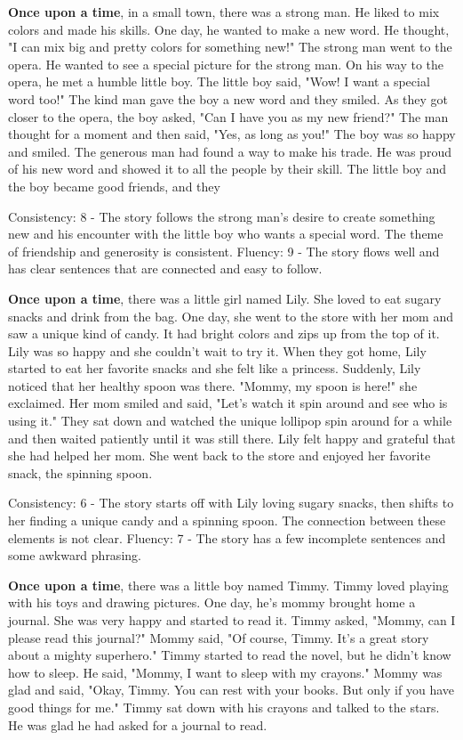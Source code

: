 \documentclass{article}
\begin{document}
\textbf{Once upon a time}, in a small town, there was a strong man. He liked to mix colors and made his skills. One day, he wanted to make a new word. He thought, "I can mix big and pretty colors for something new!" The strong man went to the opera. He wanted to see a special picture for the strong man. On his way to the opera, he met a humble little boy. The little boy said, "Wow! I want a special word too!" The kind man gave the boy a new word and they smiled. As they got closer to the opera, the boy asked, "Can I have you as my new friend?" The man thought for a moment and then said, "Yes, as long as you!" The boy was so happy and smiled. The generous man had found a way to make his trade. He was proud of his new word and showed it to all the people by their skill. The little boy and the boy became good friends, and they

Consistency: 8 - The story follows the strong man's desire to create something new and his encounter with the little boy who wants a special word. The theme of friendship and generosity is consistent.
Fluency: 9 - The story flows well and has clear sentences that are connected and easy to follow.

\textbf{Once upon a time}, there was a little girl named Lily. She loved to eat sugary snacks and drink from the bag. One day, she went to the store with her mom and saw a unique kind of candy. It had bright colors and zips up from the top of it. Lily was so happy and she couldn't wait to try it. When they got home, Lily started to eat her favorite snacks and she felt like a princess. Suddenly, Lily noticed that her healthy spoon was there. "Mommy, my spoon is here!" she exclaimed. Her mom smiled and said, "Let's watch it spin around and see who is using it." They sat down and watched the unique lollipop spin around for a while and then waited patiently until it was still there. Lily felt happy and grateful that she had helped her mom. She went back to the store and enjoyed her favorite snack, the spinning spoon.

Consistency: 6 - The story starts off with Lily loving sugary snacks, then shifts to her finding a unique candy and a spinning spoon. The connection between these elements is not clear.
Fluency: 7 - The story has a few incomplete sentences and some awkward phrasing.

\textbf{Once upon a time}, there was a little boy named Timmy. Timmy loved playing with his toys and drawing pictures. One day, he's mommy brought home a journal. She was very happy and started to read it. Timmy asked, "Mommy, can I please read this journal?" Mommy said, "Of course, Timmy. It's a great story about a mighty superhero." Timmy started to read the novel, but he didn't know how to sleep. He said, "Mommy, I want to sleep with my crayons." Mommy was glad and said, "Okay, Timmy. You can rest with your books. But only if you have good things for me." Timmy sat down with his crayons and talked to the stars. He was glad he had asked for a journal to read.
\end{document}
